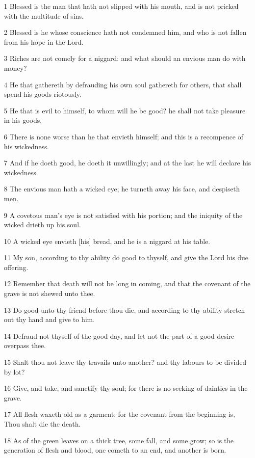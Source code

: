 \par 1 Blessed is the man that hath not slipped with his mouth, and is not pricked with the multitude of sins.
\par 2 Blessed is he whose conscience hath not condemned him, and who is not fallen from his hope in the Lord.
\par 3 Riches are not comely for a niggard: and what should an envious man do with money?
\par 4 He that gathereth by defrauding his own soul gathereth for others, that shall spend his goods riotously.
\par 5 He that is evil to himself, to whom will he be good? he shall not take pleasure in his goods.
\par 6 There is none worse than he that envieth himself; and this is a recompence of his wickedness.
\par 7 And if he doeth good, he doeth it unwillingly; and at the last he will declare his wickedness.
\par 8 The envious man hath a wicked eye; he turneth away his face, and despiseth men.
\par 9 A covetous man's eye is not satisfied with his portion; and the iniquity of the wicked drieth up his soul.
\par 10 A wicked eye envieth [his] bread, and he is a niggard at his table.
\par 11 My son, according to thy ability do good to thyself, and give the Lord his due offering.
\par 12 Remember that death will not be long in coming, and that the covenant of the grave is not shewed unto thee.
\par 13 Do good unto thy friend before thou die, and according to thy ability stretch out thy hand and give to him.
\par 14 Defraud not thyself of the good day, and let not the part of a good desire overpass thee.
\par 15 Shalt thou not leave thy travails unto another? and thy labours to be divided by lot?
\par 16 Give, and take, and sanctify thy soul; for there is no seeking of dainties in the grave.
\par 17 All flesh waxeth old as a garment: for the covenant from the beginning is, Thou shalt die the death.
\par 18 As of the green leaves on a thick tree, some fall, and some grow; so is the generation of flesh and blood, one cometh to an end, and another is born.

